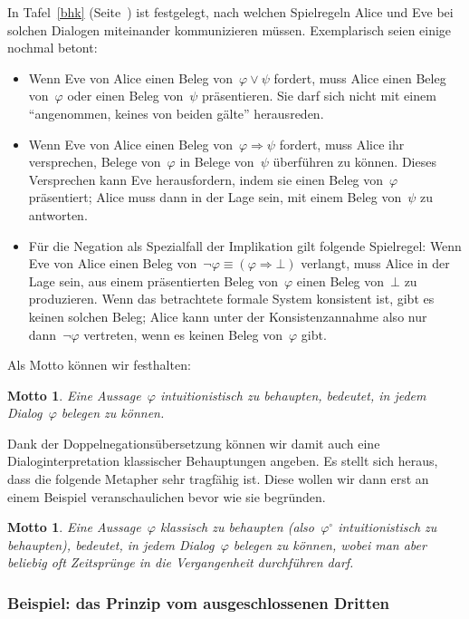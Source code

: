 \documentclass[a4paper,ngerman,12pt]{scrartcl}
\theoremstyle{definition}
\theoremstyle{plain}
\newtheorem{motto}[defn]{Motto}
\theoremstyle{remark}
\renewcommand{\_}{\mathpunct{.}\,}
\newcommand{\?}{\,{:}\,}
\begin{document}
In Tafel~\ref{bhk} (Seite~\pageref{bhk}) ist festgelegt, nach welchen
Spielregeln Alice und Eve bei solchen Dialogen miteinander kommunizieren
müssen. Exemplarisch seien einige nochmal betont:
\begin{itemize}
\item Wenn Eve von Alice einen Beleg von~$\varphi \vee \psi$ fordert,
muss Alice einen Beleg von~$\varphi$ oder einen Beleg von~$\psi$ präsentieren.
Sie darf sich nicht mit einem "`angenommen, keines von beiden gälte"'
herausreden.
\item Wenn Eve von Alice einen Beleg von~$\varphi \Rightarrow \psi$
fordert, muss Alice ihr versprechen, Belege von~$\varphi$ in Belege von~$\psi$
überführen zu können. Dieses Versprechen kann Eve herausfordern, indem sie
einen Beleg von~$\varphi$ präsentiert; Alice muss dann in der Lage sein, mit
einem Beleg von~$\psi$ zu antworten.
\item Für die Negation als Spezialfall der Implikation gilt folgende Spielregel: Wenn Eve von
Alice einen Beleg von~$\neg\varphi \equiv (\varphi \Rightarrow \bot)$ verlangt,
muss Alice in der Lage sein, aus einem präsentierten Beleg von~$\varphi$ einen
Beleg von~$\bot$ zu produzieren. Wenn das betrachtete formale System konsistent
ist, gibt es keinen solchen Beleg; Alice kann unter der Konsistenzannahme also
nur dann~$\neg\varphi$ vertreten, wenn es keinen Beleg von~$\varphi$ gibt.
\end{itemize}

Als Motto können wir festhalten:

\begin{motto}
Eine Aussage~$\varphi$ intuitionistisch zu behaupten, bedeutet, in jedem
Dialog~$\varphi$ belegen zu können.
\end{motto}

Dank der Doppelnegationsübersetzung können wir damit auch eine
Dialoginterpretation klassischer Behauptungen angeben. Es stellt sich heraus,
dass die folgende Metapher sehr tragfähig ist. Diese wollen wir dann erst an
einem Beispiel veranschaulichen bevor wie sie begründen.

\begin{motto}
Eine Aussage~$\varphi$ klassisch zu behaupten (also~$\varphi^\circ$
intuitionistisch zu behaupten), bedeutet, in jedem Dialog~$\varphi$ belegen zu
können, wobei man aber beliebig oft Zeitsprünge in die Vergangenheit
durchführen darf.
\end{motto}


\subsubsection*{Beispiel: das Prinzip vom ausgeschlossenen Dritten}
\end{document}
